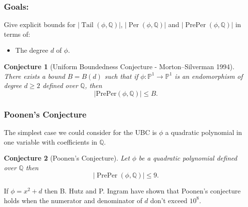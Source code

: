 \documentclass{beamer}
\def\jump{ \quad \\ \vspace{0.7cm} \pause}
\def\PP{{\mathbb P}}
\def\QQ{{\mathbb Q}}
\DeclareMathOperator{\Tail}{Tail}
\DeclareMathOperator{\Per}{Per}
\DeclareMathOperator{\PrePer}{PrePer}
\theoremstyle{thmstyle}
\theoremstyle{thmstyle}
\theoremstyle{mystyle}
\newtheorem*{conjecture}{Conjecture}
\theoremstyle{qstnstyle}
\begin{document}
\begin{frame}
\frametitle{Goals:}
Give explicit bounds for $|\Tail(\phi,\QQ)|$, $|\Per(\phi,\QQ)|$ and $|\PrePer(\phi,\QQ)|$ in terms of:\pause
\begin{itemize}
\item The degree $d$ of $\phi$.
\end{itemize}

\pause

\begin{conjecture}[Uniform Boundedness Conjecture - Morton--Silverman
  1994]
There exists a bound $B = B(d)$ such that if $\phi:\mathbb{P}^1\rightarrow\mathbb{P}^1$ is an endomorphism of degree $d\geq{2}$ defined over $\QQ$, then 
$$|\text{PrePer}(\phi,\QQ)| \leq B.$$
\end{conjecture}
\end{frame}

%
%


\begin{frame}
\frametitle{Poonen's Conjecture}

The simplest case we could consider for the UBC is \pause  $\phi$ a quadratic polynomial in one variable with coefficients in $\QQ$.

\pause
\vspace{4mm}


\begin{conjecture}[Poonen's Conjecture]
Let $\phi$ be a quadratic polynomial defined over $\mathbb{Q}$ then 
$$|\PrePer(\phi,\QQ)| \leq 9.$$
\end{conjecture}

\pause
\vspace{6mm}

If $\phi=x^2+d$ then B. Hutz and P. Ingram have shown that Poonen's conjecture holds when the numerator and denominator of $d$ don't exceed $10^8$.

\end{frame}
\end{document}

